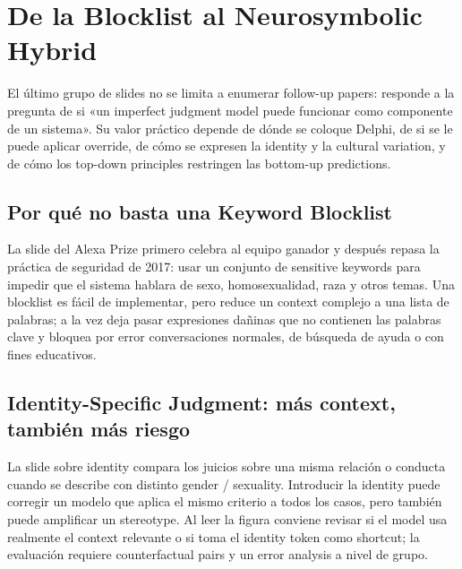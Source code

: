 \section{De la Blocklist al Neurosymbolic Hybrid}

El último grupo de slides no se limita a enumerar follow-up papers: responde a la pregunta de si «un imperfect judgment model puede funcionar como componente de un sistema». Su valor práctico depende de dónde se coloque Delphi, de si se le puede aplicar override, de cómo se expresen la identity y la cultural variation, y de cómo los top-down principles restringen las bottom-up predictions.

\subsection{Por qué no basta una Keyword Blocklist}

La slide del Alexa Prize primero celebra al equipo ganador y después repasa la práctica de seguridad de 2017: usar un conjunto de sensitive keywords para impedir que el sistema hablara de sexo, homosexualidad, raza y otros temas. Una blocklist es fácil de implementar, pero reduce un context complejo a una lista de palabras; a la vez deja pasar expresiones dañinas que no contienen las palabras clave y bloquea por error conversaciones normales, de búsqueda de ayuda o con fines educativos.



\subsection{Identity-Specific Judgment: más context, también más riesgo}

La slide sobre identity compara los juicios sobre una misma relación o conducta cuando se describe con distinto gender / sexuality. Introducir la identity puede corregir un modelo que aplica el mismo criterio a todos los casos, pero también puede amplificar un stereotype. Al leer la figura conviene revisar si el model usa realmente el context relevante o si toma el identity token como shortcut; la evaluación requiere counterfactual pairs y un error analysis a nivel de grupo.

